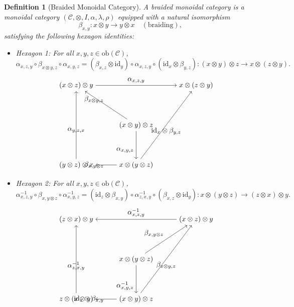 \documentclass{article}
\theoremstyle{plain}
\newtheorem{definition}[theorem]{Definition}
\theoremstyle{remark}
\begin{document}
\begin{definition}[Braided Monoidal Category]
A \emph{braided monoidal category} is a monoidal category $(\mathcal{C}, \otimes, I, \alpha, \lambda, \rho)$ equipped with a natural isomorphism
\[
\beta_{x,y} : x \otimes y \to y \otimes x \quad (\text{braiding}),
\]
satisfying the following hexagon identities:
\begin{itemize}
    \item \emph{Hexagon 1}: For all $x, y, z \in \mathrm{ob}(\mathcal{C})$,
    \[
    \alpha_{x,z,y} \circ \beta_{x \otimes y, z} \circ \alpha_{x,y,z} = (\beta_{x,z} \otimes \mathrm{id}_y) \circ \alpha_{x,z,y} \circ (\mathrm{id}_x \otimes \beta_{y,z}) : (x \otimes y) \otimes z \to x \otimes (z \otimes y).
    \]
    \[
    \begin{tikzpicture}
        \node (center) at (0,0) {$(x \otimes y) \otimes z$};
        \node (topleft) at (-3,2) {$(x \otimes z) \otimes y$};
        \node (topright) at (3,2) {$x \otimes (z \otimes y)$};
        \node (bottomleft) at (-3,-2) {$(y \otimes z) \otimes x$};
        \node (bottomcenter) at (0,-2) {$x \otimes (y \otimes z)$};
        \draw[->] (center) to node[above left] {$\beta_{x \otimes y, z}$} (topleft);
        \draw[->] (center) to node[below left] {$\alpha_{x,y,z}$} (bottomcenter);
        \draw[->] (topleft) to node[above] {$\alpha_{x,z,y}$} (topright);
        \draw[->] (bottomcenter) to node[below] {$\mathrm{id}_x \otimes \beta_{y,z}$} (topright);
        \draw[->] (bottomcenter) to node[left] {$\beta_{x,y \otimes z}$} (bottomleft);
        \draw[->] (bottomleft) to node[below] {$\alpha_{y,z,x}$} (topleft);
    \end{tikzpicture}
    \]
    \item \emph{Hexagon 2}: For all $x, y, z \in \mathrm{ob}(\mathcal{C})$,
    \[
    \alpha_{x,z,y}^{-1} \circ \beta_{x, y \otimes z} \circ \alpha_{x,y,z}^{-1} = (\mathrm{id}_z \otimes \beta_{x,y}) \circ \alpha_{z,x,y}^{-1} \circ (\beta_{x,z} \otimes \mathrm{id}_y) : x \otimes (y \otimes z) \to (z \otimes x) \otimes y.
    \]
    \[
    \begin{tikzpicture}
        \node (center) at (0,0) {$x \otimes (y \otimes z)$};
        \node (topleft) at (-3,2) {$(z \otimes x) \otimes y$};
        \node (topright) at (3,2) {$(x \otimes z) \otimes y$};
        \node (bottomleft) at (-3,-2) {$z \otimes (x \otimes y)$};
        \node (bottomcenter) at (0,-2) {$(x \otimes y) \otimes z$};
        \draw[->] (center) to node[above left] {$\beta_{x, y \otimes z}$} (topright);
        \draw[->] (center) to node[below left] {$\alpha_{x,y,z}^{-1}$} (bottomcenter);
        \draw[->] (topright) to node[above] {$\alpha_{x,z,y}^{-1}$} (topleft);
        \draw[->] (bottomcenter) to node[below] {$\beta_{x \otimes y, z}$} (topright);
        \draw[->] (bottomcenter) to node[left] {$\mathrm{id}_z \otimes \beta_{x,y}$} (bottomleft);
        \draw[->] (bottomleft) to node[below] {$\alpha_{z,x,y}^{-1}$} (topleft);
    \end{tikzpicture}
    \]
\end{itemize}
\end{definition}
\end{document}
